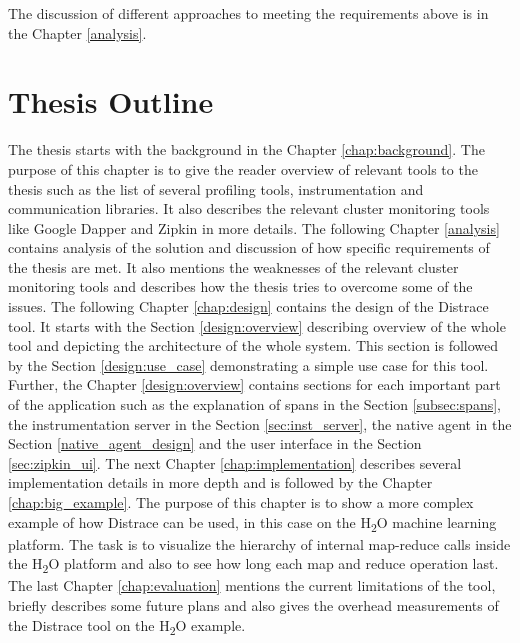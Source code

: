 The discussion of different approaches to meeting the requirements above is in the Chapter \ref{analysis}.

\section{Thesis Outline}
The thesis starts with the background in the Chapter \ref{chap:background}. The purpose of this chapter is to give the reader overview of relevant tools to the thesis such as the list of several profiling tools, instrumentation and communication libraries. It also describes the relevant cluster monitoring tools like Google Dapper and Zipkin in more details. The following Chapter \ref{analysis} contains analysis of the solution and discussion of how specific requirements of the thesis are met. It also mentions the weaknesses of the relevant cluster monitoring tools and describes how the thesis tries to overcome some of the issues. The following Chapter \ref{chap:design} contains the design of the Distrace tool. It starts with the Section \ref{design:overview} describing overview of the whole tool and depicting the architecture of the whole system. This section is followed by the Section \ref{design:use_case} demonstrating a simple use case for this tool. Further, the Chapter \ref{design:overview} contains sections for each important part of the application such as the explanation of spans in the Section \ref{subsec:spans}, the instrumentation server in the Section \ref{sec:inst_server}, the native agent in the Section \ref{native_agent_design} and the user interface in the Section \ref{sec:zipkin_ui}. The next Chapter \ref{chap:implementation} describes several implementation details in more depth and is followed by the Chapter \ref{chap:big_example}. The purpose of this chapter is to show a more complex example of how Distrace can be used, in this case on the H\textsubscript{2}O machine learning platform. The task is to visualize the hierarchy of internal map-reduce calls inside the H\textsubscript{2}O platform and also to see how long each map and reduce operation last. The last Chapter \ref{chap:evaluation} mentions the current limitations of the tool, briefly describes some future plans and also gives the overhead measurements of the Distrace tool on the H\textsubscript{2}O example. 
